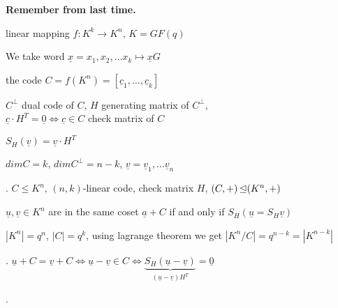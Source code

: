 

\textbf{Remember from last time.}

linear mapping $f: K^k \rightarrow K^n$, $K = GF(q)$

We take word $\underline{x} = x_1, x_2, \ldots x_k \mapsto \underline{x} G$

the code $C = f(K^n) = [\underline{c}_1, \ldots, \underline{c}_k]$

$C^\bot$ dual code of $C$, $H$ generating matrix of $C^\bot$, \\
$\underline{c}\cdot H^T = \underline{0} \Leftrightarrow \underline{c} \in C$ check matrix of $C$

$S_H(\underline{v}) = \underline{v} \cdot H^T$

$dim C = k$, $dim C^\bot = n-k$, $\underline{v} = \underline{v}_1, \ldots \underline{v}_n$

\Theorem.
$C\leq K^n$, $(n,k)$-linear code, check matrix $H$, $(C,+) \operatorname{\trianglelefteq} (K^n, +)$

$\underline{u}, \underline{v} \in K^n$ are in the same coset $\underline{a} + C$ if and only if $S_H(\underline{u} = S_H\underline{v})$

$|K^n| = q^n$, $|C| = q^k$, using lagrange theorem we get $|K^n / C| = q^{n-k} = |K^{n-k}|$

\Proof. 
$\underline{u} + C = \underline{v} + C \Leftrightarrow \underline{u} - \underline{v} \in C \Leftrightarrow \underbrace{S_H(\underline{u}-\underline{v})}_{(\underline{u}-\underline{v}) H^T} = \underline{0}$


\Example.

